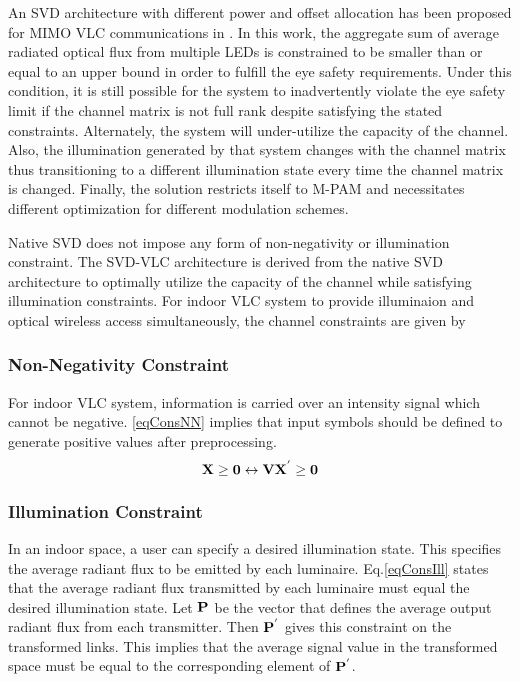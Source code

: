 An SVD architecture with different power and offset allocation has been proposed for MIMO VLC communications in \cite{par11a}. In this work, the aggregate sum of average radiated optical flux from multiple LEDs is constrained to be smaller than or equal to an upper bound in order to fulfill the eye safety requirements. Under this condition, it is still possible for the system to inadvertently violate the eye safety limit if the channel matrix is not full rank despite satisfying the stated constraints. Alternately, the system will under-utilize the capacity of the channel. Also, the illumination generated by that system changes with the channel matrix thus transitioning to a different illumination state every time the channel matrix is changed. Finally, the solution restricts itself to M-PAM and necessitates different optimization for different modulation schemes.

Native SVD does not impose any form of non-negativity or illumination constraint. The SVD-VLC architecture is derived from the native SVD architecture to optimally utilize the capacity of the channel while satisfying illumination constraints. For indoor VLC system to provide illuminaion and optical wireless access simultaneously, the channel constraints are given by

\subsubsection{Non-Negativity Constraint}
\label{subsubsec:svdvlcSystemNonnegative}

For indoor VLC system, information is carried over an intensity signal which cannot be negative. \ref{eqConsNN} implies that input symbols should be defined to generate positive values after preprocessing.
\begin{equation}
	\label{eqConsNN}
	{\bf{X}} \geq {\bf{0}} \leftrightarrow {\bf{V}}{\bf{X}}^{'} \geq {\bf{0}}\\
\end{equation}
	
\subsubsection{Illumination Constraint}
\label{subsubsec:svdvlcSystemIllumination}

In an indoor space, a user can specify a desired illumination state. This specifies the average radiant flux to be emitted by each luminaire. Eq.\ref{eqConsIll} states that the average radiant flux transmitted by each luminaire must equal the desired illumination state. Let ${\bf{P}}$ be the vector that defines the average output radiant flux from each transmitter. Then ${\bf{P}}^{'}$ gives this constraint on the transformed links. This implies that the average signal value in the transformed space must be equal to the corresponding element of ${\bf{P}}^{'}$. 

